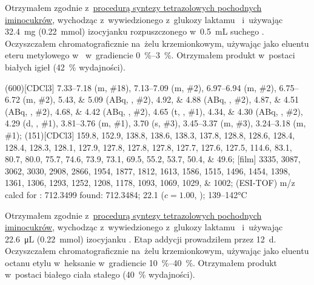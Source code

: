Otrzymałem zgodnie z~\hyperref[experimental:sugars:schwartz]{procedurą syntezy tetrazolowych
	pochodnych iminocukrów}, wychodząc z~wywiedzionego z~glukozy laktamu~
	i~używając \SI{32.4}{\milli\gram} (\SI{0.22}{\milli\mol}) izocyjanku 
	rozpuszczonego w~\SI{0.5}{\milli\liter} suchego .
Oczyszczałem chromatograficznie na~żelu krzemionkowym,
	używając jako eluentu eteru  metylowego w~ w~gradiencie
	\SIrange{0}{3}{\percent}.
Otrzymałem produkt w~postaci białych igieł (\SI{42}{\percent} wydajności).

\begin{fullexp}
	\NMR(600)[CDCl3] \numrange{7.33}{7.18} (m, \#{18}), \numrange{7.13}{7.09} (m, \#{2}), \numrange{6.97}{6.94} (m, \#{2}), \numrange{6.75}{6.72} (m, \#{2}), \numlist{5.43;5.09} (ABq, , \#{2}), \numlist{4.92;4.88} (ABq, , \#{2}), \numlist{4.87;4.51} (ABq, , \#{2}), \numlist{4.68;4.42} (ABq, , \#{2}), \num{4.65} (t, , \#{1}), \numlist{4.34;4.30} (ABq, , \#{2}), \num{4.29} (d, , \#{1}), \numrange{3.81}{3.76} (m, \#{1}), \num{3.70} (s, \#{3}), \numrange{3.45}{3.37} (m, \#{3}), \numrange{3.24}{3.18} (m, \#{1});
	(151)[CDCl3] \numlist{159.8; 152.9; 138.8; 138.6; 138.3; 137.8; 128.8; 128.6; 128.4; 128.4; 128.3; 128.1; 127.9; 127.8; 127.8; 127.8; 127.7; 127.6; 127.5; 114.6; 83.1; 80.7; 80.0; 75.7; 74.6; 73.9; 73.1; 69.5; 55.2; 53.7; 50.4; 49.6};
	[film] \numlist{3335; 3087; 3062; 3030; 2908; 2866; 1954; 1877; 1812; 1613; 1586; 1515; 1496; 1454; 1398; 1361; 1306; 1293; 1252; 1208; 1178; 1093; 1069; 1029; 1002};
	 (ESI-TOF) m/z calcd for : \num{712.3499} found: \num{712.3484};
	\data{[$\alpha^{23}_D$]~$=$} \num{22.1} ($c = 1.00$, );
	 \numrange{139}{142}\si{\celsius}
\end{fullexp}

Otrzymałem zgodnie z~\hyperref[experimental:sugars:schwartz]{procedurą syntezy tetrazolowych
	pochodnych iminocukrów}, wychodząc z~wywiedzionego z~glukozy laktamu~
	i~używając \SI{22.6}{\micro\liter} (\SI{0.22}{\milli\mol}) izocyjanku .
Etap addycji prowadziłem przez \SI{12}{\day}.
Oczyszczałem chromatograficznie na~żelu krzemionkowym,
	używając jako eluentu octanu etylu w~heksanie w~gradiencie \SIrange{10}{40}{\percent}.
Otrzymałem produkt w~postaci białego ciała stałego (\SI{40}{\percent} wydajności).

